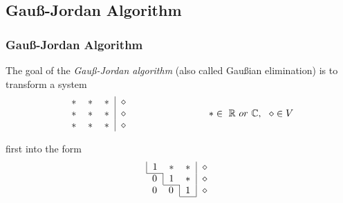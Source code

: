 \documentclass{beamer}
\renewcommand{\emph}[1]{{\color{Turquoise3}\textsl{#1}}}
\newcommand{\C}{\mathbb{C}} \newcommand{\F}{\mathbb{F}} \newcommand{\R}{\mathbb{R}} \newcommand{\Q}{\mathbb{Q}}
\begin{document}
\subsection{Gau\ss-Jordan Algorithm}
\begin{frame}
    \frametitle{Gau\ss-Jordan Algorithm}
    The goal of the \emph{Gau\ss-Jordan algorithm} (also called Gau\ss ian elimination) is to transform a system
    \begin{equation*}
        \begin{tabular}{ccc|c}
            $\ast$ & $\ast$ & $\ast$ & $\diamond$ \\
            $\ast$ & $\ast$ & $\ast$ & $\diamond$ \\
            $\ast$ & $\ast$ & $\ast$ & $\diamond$ \\
        \end{tabular}
        \qquad\qquad\qquad\qquad
        \ast\in~\R~or~\C,~~\diamond\in V
    \end{equation*}

    first into the form \\
    \begin{equation}
        \begin{array}{c}
            \begin{tabular}{|ccc|c}
                1 & $\ast$ & $\ast$ & $\diamond$ \\ \cline{1-1}
            \end{tabular} \\
            \begin{tabular}{c|cc|c}
                0 & $1$ & $\ast$ & $\diamond$ \\ \cline{2-2}
            \end{tabular} \\
            \begin{tabular}{cc|c|c}
                0 & $0$ & $1$ & $\diamond$ \\
                \cline{3-3}
            \end{tabular}
        \end{array}
    \end{equation}


\end{frame}
\end{document}
